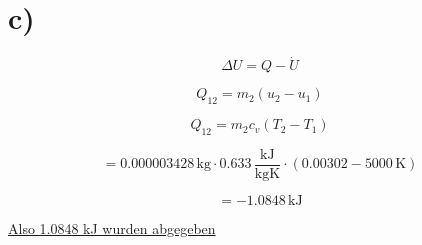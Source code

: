 

\section*{c)}

\[
\Delta U = Q - \dot{U}
\]

\[
Q_{12} = m_2 (u_2 - u_1)
\]

\[
Q_{12} = m_2 c_v (T_2 - T_1)
\]

\[
= 0.000003428 \, \text{kg} \cdot 0.633 \, \frac{\text{kJ}}{\text{kgK}} \cdot (0.00302 - 5000 \, \text{K})
\]

\[
= -1.0848 \, \text{kJ}
\]

\underline{Also 1.0848 kJ wurden abgegeben}